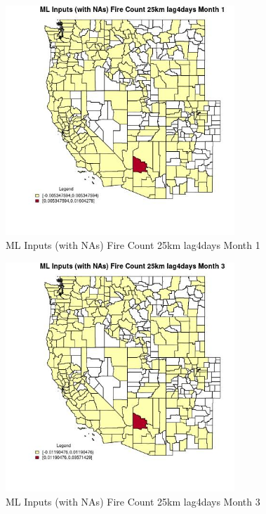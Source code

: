 \begin{figure} 
\centering  
\includegraphics[width=0.77\textwidth]{Code_Outputs/Report_ML_input_PM25_Step4_part_e_de_duplicated_aves_compiled_2019-05-20wNAs_CountyFire_Count_25km_lag4daysmedianMonth1.jpg} 
\caption{\label{fig:Report_ML_input_PM25_Step4_part_e_de_duplicated_aves_compiled_2019-05-20wNAsCountyFire_Count_25km_lag4daysmedianMonth1}ML Inputs (with NAs) Fire Count 25km lag4days Month 1} 
\end{figure} 
 

\begin{figure} 
\centering  
\includegraphics[width=0.77\textwidth]{Code_Outputs/Report_ML_input_PM25_Step4_part_e_de_duplicated_aves_compiled_2019-05-20wNAs_CountyFire_Count_25km_lag4daysmedianMonth3.jpg} 
\caption{\label{fig:Report_ML_input_PM25_Step4_part_e_de_duplicated_aves_compiled_2019-05-20wNAsCountyFire_Count_25km_lag4daysmedianMonth3}ML Inputs (with NAs) Fire Count 25km lag4days Month 3} 
\end{figure} 
 

